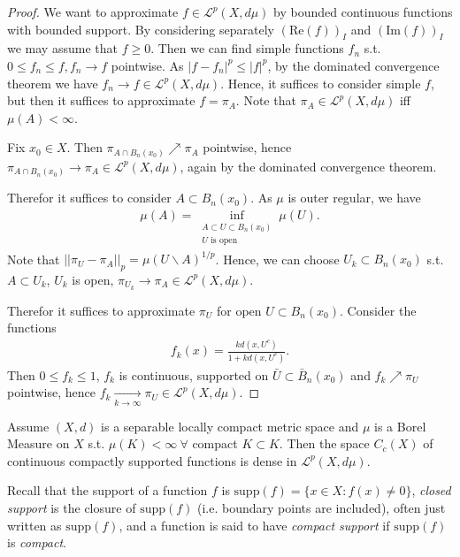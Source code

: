 \begin{proof}
    We want to approximate \(f\in\mathcal{L}^p(X,d\mu)\) by bounded continuous functions with bounded support. By considering separately 
    \((\text{Re}(f))_I\) and \((\text{Im}(f))_I\) we may assume that \(f\geq 0\). Then we can find simple functions \(f_n\) s.t. 
    \(0\leq f_n\leq f, f_n\rightarrow f\) pointwise. As \(\vert  f- f_n\vert^p \leq \vert f\vert^p\), by the dominated convergence theorem
    we have \(f_n\rightarrow f\in\mathcal{L}^p(X,d\mu)\). Hence, it suffices to consider simple \(f\), but then it suffices to approximate
    \(f=\pi_A\). Note that \(\pi_A\in\mathcal{L}^p(X,d\mu)\) iff \(\mu(A)<\infty\). 

    Fix \(x_0\in X\). Then \(\pi_{A\cap B_n(x_0)} \nearrow \pi_A\) pointwise, hence 
    \(\pi_{A\cap B_n(x_0)}\rightarrow \pi_A\in\mathcal{L}^p(X,d\mu)\), again by the dominated convergence theorem. 

    Therefor it suffices to consider \(A\subset B_n(x_0)\). As \(\mu\) is outer regular, we have 
    \begin{align*}
        \mu(A) = \inf_{\substack{A\subset U\subset B_n(x_0) \\ U \text{ is open}}} \mu(U).
    \end{align*}
    Note that \(\vert\vert \pi_U - \pi_A\vert\vert_p = \mu(U\backslash A)^{1/p}\). Hence, we can choose \(U_k\subset B_n(x_0)\) s.t.
    \(A\subset U_k\), \(U_k\) is open, \(\pi_{U_k}\rightarrow \pi_A\in\mathcal{L}^p(X,d\mu)\).

    Therefor it suffices to approximate \(\pi_U\) for open \(U\subset B_n(x_0)\). Consider the functions
    \begin{align*}
        f_k(x) = \frac{kd(x,U^c)}{1+kd(x,U^c)}.
    \end{align*}
    Then \(0\leq f_k\leq 1\), \(f_k\) is continuous, supported on \(\bar{U} \subset \bar{B}_n(x_0)\) and \(f_k\nearrow\pi_U\) pointwise, hence
    \(f_k\xrightarrow[k\rightarrow \infty]{ } \pi_U\in\mathcal{L}^p(X,d\mu)\).
\end{proof}
\fi 
\begin{theorem}
    Assume \((X,d)\) is a separable locally compact metric space and \(\mu\) is a Borel Measure on \(X\) s.t. \(\mu(K)<\infty \ \forall \)
    compact \(K\subset K\). Then the space \(C_c(X)\) of continuous compactly supported functions is dense in \(\mathcal{L}^p(X,d\mu)\).
\end{theorem}

Recall that the support of a function \(f\) is \(\text{supp}(f) = \{x\in X: f(x) \neq 0\}\), \emph{closed support} is the closure of 
\(\text{supp}(f)\) (i.e. boundary points
are included), often just written as \(\text{supp}(f)\), and a function is said to have \emph{compact support} if \(\text{supp}(f)\) is
\emph{compact}.

